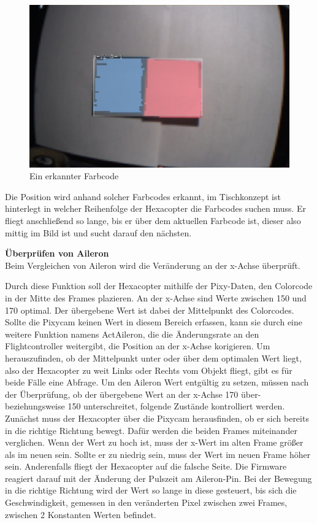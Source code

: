     \begin{figure} [tbh]
      \begin{centering}
        \includegraphics[width = \textwidth]{Bilder/Farbcode_erkannt}
      \par\end{centering}
      \caption{Ein erkannter Farbcode}
      \label{Farbcode_erkannt}
    \end{figure}
    Die Position wird anhand solcher Farbcodes erkannt, im Tischkonzept ist hinterlegt in welcher Reihenfolge der Hexacopter die Farbcodes suchen muss.
    Er fliegt anschließend so lange, bis er über dem aktuellen Farbcode ist, dieser also mittig im Bild ist und sucht darauf den nächsten.

    \textbf{Überprüfen von Aileron}\\
    Beim Vergleichen von Aileron wird die Veränderung an der x-Achse überprüft.

    Durch diese Funktion soll der Hexacopter mithilfe der Pixy-Daten, den Colorcode in der Mitte des Frames plazieren. An der x-Achse sind Werte zwischen 150 und 170 optimal. Der übergebene Wert ist dabei der Mittelpunkt des Colorcodes.
    Sollte die Pixycam keinen Wert in diesem Bereich erfassen, kann sie durch eine weitere Funktion namens ActAileron, die die Änderungsrate an den Flightcontroller weitergibt, die Position an der x-Achse korigieren.
    Um herauszufinden, ob der Mittelpunkt unter oder über dem optimalen Wert liegt, also der Hexacopter zu weit Links oder Rechts vom Objekt fliegt, gibt es für beide Fälle eine Abfrage.
    Um den Aileron Wert entgültig zu setzen, müssen nach der Überprüfung, ob der übergebene Wert an der x-Achse 170 über- beziehungsweise 150 unterschreitet, folgende Zustände kontrolliert werden.
    Zunächst muss der Hexacopter über die Pixycam herausfinden, ob er sich bereits in die richtige Richtung bewegt. Dafür werden die beiden Frames miteinander verglichen. Wenn der Wert zu hoch ist, muss der x-Wert im alten Frame größer als im neuen sein. Sollte er zu niedrig sein, muss der Wert im neuen Frame höher sein.
    Anderenfalls fliegt der Hexacopter auf die falsche Seite. Die Firmware reagiert darauf mit der Änderung der Pulszeit am Aileron-Pin.
    Bei der Bewegung in die richtige Richtung wird der Wert so lange in diese gesteuert, bis sich die Geschwindigkeit, gemessen in den veränderten Pixel zwischen zwei Frames, zwischen 2 Konstanten Werten befindet.

